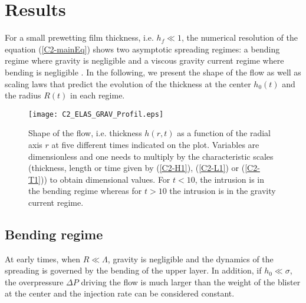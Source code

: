 \section{Results}
\label{C2-sec:regime-propagations}

For a small prewetting film  thickness, i.e.  $h_f\ll1$, the numerical
resolution  of the  equation  (\ref{C2-mainEq})  shows two  asymptotic
spreading regimes: a bending regime  where gravity is negligible and a
viscous   gravity  current   regime   where   bending  is   negligible
\citep{Michaut:2011kg,Bunger:2011cb,Lister:2013ia}. In  the following,
we present the shape of the flow  as well as scaling laws that predict
the evolution of  the thickness at the center $h_0(t)$  and the radius
$R(t)$ in each regime.

\begin{figure}[h!]
  \begin{center}
    \graphicspath{ {/Users/thorey/Documents/These/Manuscript/Figure/Chapter2/} }
    \texttt{[image: C2\_ELAS\_GRAV\_Profil.eps]}
    \caption{Shape of the flow, i.e.  thickness $h(r,t)$ as a function
      of the radial axis $r$ at  five different times indicated on the
      plot. Variables are  dimensionless and one needs  to multiply by
      the characteristic  scales (thickness,  length or time  given by
      (\ref{C2-H1}),   (\ref{C2-L1})  or   (\ref{C2-T1}))  to   obtain
      dimensional values.  For $t<10$, the intrusion is in the bending
      regime  whereas  for $t>10$  the  intrusion  is in  the  gravity
      current regime.}
    \label{C2_ELAS_GRAV_Profil}
  \end{center}
\end{figure}

\subsection{Bending regime}
\label{C2-sec:bending-regime}

At  early times,  when $R\ll\Lambda$,  gravity is  negligible and  the
dynamics of  the spreading  is governed  by the  bending of  the upper
layer.  In  addition, if  $h_0\ll\sigma$, the overpressure  $\Delta P$
driving the flow is much larger than  the weight of the blister at the
center and the injection rate can be considered constant.

